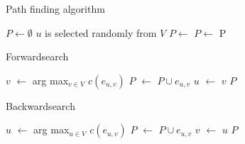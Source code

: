 \documentclass{article}
\begin{document}
\begin{algorithm}
    \caption{Path finding algorithm}
    \begin{algorithmic}[1]
        \State $P \leftarrow \emptyset$
        \State $u$ is selected randomly from $V$
        \State $P \leftarrow$ 
        \State $P \leftarrow$ 
        \State \Return P
        \EndProcedure
    \end{algorithmic}
\end{algorithm}

\begin{algorithm}
    \caption{Forwardsearch}
    \begin{algorithmic}[1]
                \State $v$ $\leftarrow$ arg max$_{v \in V}$ $c(e_{u,v})$
                \State $P$ $\leftarrow$ $P \cup e_{u,v}$
                \State $u$ $\leftarrow$ $v$
            \EndWhile
            \State \Return $P$
        \EndProcedure
    \end{algorithmic}
\end{algorithm}

\begin{algorithm}
    \caption{Backwardsearch}
    \begin{algorithmic}[1]
                \State $u$ $\leftarrow$ arg max$_{u \in V}$ $c(e_{u,v})$
                \State $P$ $\leftarrow$ $P \cup e_{u,v}$
                \State $v$ $\leftarrow$ $u$
            \EndWhile
            \State \Return $P$
        \EndProcedure
    \end{algorithmic}
\end{algorithm}
\end{document}
